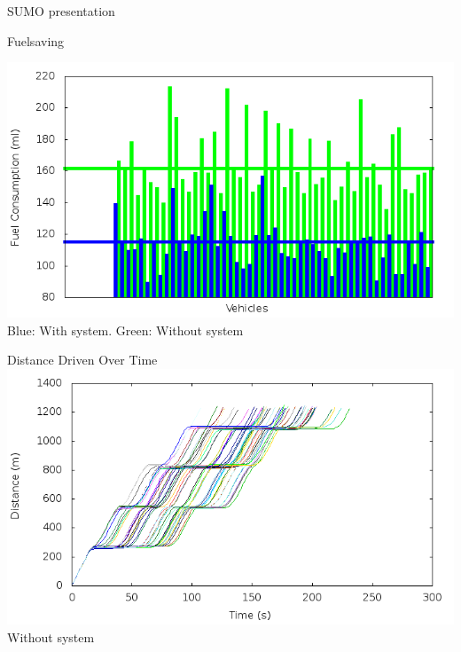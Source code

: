 \begin{frame}{SUMO presentation}
\end{frame}


\begin{frame}{Fuelsaving}

	\includegraphics[width=1\textwidth]{images/tp0/fuelRoute.png}\\
	Blue: With system. Green: Without system

\end{frame}

\begin{frame}{Distance Driven Over Time}
	\includegraphics[width=1\textwidth]{images/tp0/distance0.png}\\
	Without system
\end{frame}

